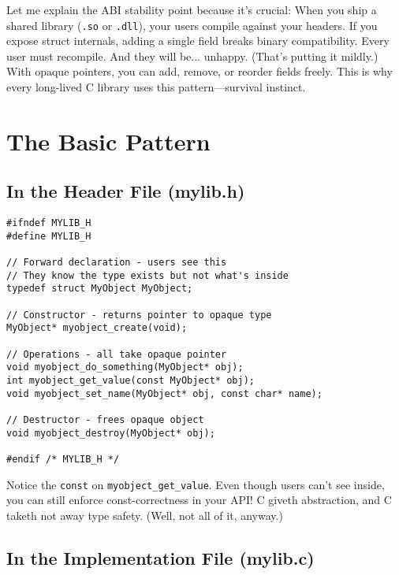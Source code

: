Let me explain the ABI stability point because it's crucial: When you ship a shared library (\texttt{.so} or \texttt{.dll}), your users compile against your headers. If you expose struct internals, adding a single field breaks binary compatibility. Every user must recompile. And they will be... unhappy. (That's putting it mildly.) With opaque pointers, you can add, remove, or reorder fields freely. This is why every long-lived C library uses this pattern—survival instinct.

\section{The Basic Pattern}

\subsection{In the Header File (mylib.h)}

\begin{lstlisting}
#ifndef MYLIB_H
#define MYLIB_H

// Forward declaration - users see this
// They know the type exists but not what's inside
typedef struct MyObject MyObject;

// Constructor - returns pointer to opaque type
MyObject* myobject_create(void);

// Operations - all take opaque pointer
void myobject_do_something(MyObject* obj);
int myobject_get_value(const MyObject* obj);
void myobject_set_name(MyObject* obj, const char* name);

// Destructor - frees opaque object
void myobject_destroy(MyObject* obj);

#endif /* MYLIB_H */
\end{lstlisting}

\begin{notebox}
Notice the \texttt{const} on \texttt{myobject\_get\_value}. Even though users can't see inside, you can still enforce const-correctness in your API! C giveth abstraction, and C taketh not away type safety. (Well, not all of it, anyway.)
\end{notebox}

\subsection{In the Implementation File (mylib.c)}

